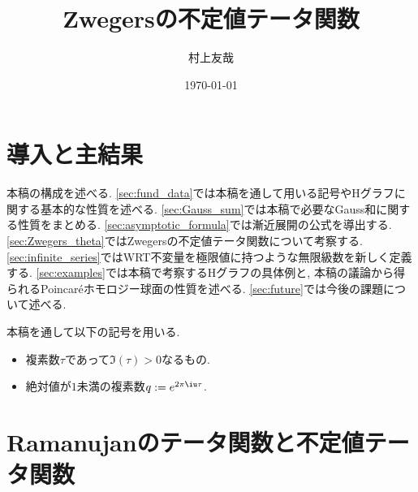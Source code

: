 \documentclass[11pt,b5paper,oneside,lualatex]{ltjsarticle} %
\numberwithin{equation}{section} %
\begin{document}

\title{Zwegersの不定値テータ関数}
\author{村上友哉}
\date{\today}

\maketitle

\tableofcontents


\section{導入と主結果} \label{sec:intro}




本稿の構成を述べる. 
\cref{sec:fund_data}では本稿を通して用いる記号やHグラフに関する基本的な性質を述べる. 
\cref{sec:Gauss_sum}では本稿で必要なGauss和に関する性質をまとめる. 
\cref{sec:asymptotic_formula}では漸近展開の公式を導出する. 
\cref{sec:Zwegers_theta}ではZwegersの不定値テータ関数について考察する. 
\cref{sec:infinite_series}ではWRT不変量を極限値に持つような無限級数を新しく定義する. 
\cref{sec:examples}では本稿で考察するHグラフの具体例と, 本稿の議論から得られるPoincar\'{e}ホモロジー球面の性質を述べる. 
\cref{sec:future}では今後の課題について述べる. 

本稿を通して以下の記号を用いる. 

\begin{symb}
	\begin{itemize}
		\item 複素数$ \tau $であって$ \Im(\tau) > 0 $なるもの.
		\item 絶対値が$ 1 $未満の複素数$ q := e^{2\pi\iu\tau} $.
	\end{itemize}
\end{symb}


\section{Ramanujanのテータ関数と不定値テータ関数} \label{sec:mock}

\end{document}
